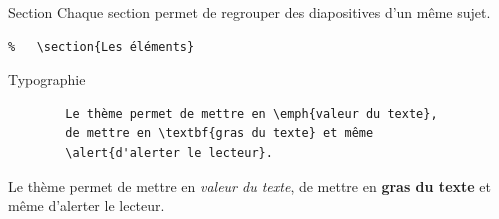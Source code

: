 \documentclass[9pt]{beamer}
\begin{document}
\begin{frame}[fragile]{Section}
	Chaque section permet de regrouper des diapositives d'un même sujet.
	\begin{verbatim}
% 	\section{Les éléments}
	\end{verbatim}
 \end{frame}

 \begin{frame}[fragile]{Typographie}
 	\begin{verbatim}
		Le thème permet de mettre en \emph{valeur du texte},
		de mettre en \textbf{gras du texte} et même
		\alert{d'alerter le lecteur}.
 	\end{verbatim}
 	Le thème permet de mettre en \emph{valeur du texte}, de mettre en \textbf{gras du texte} et même \alert{d'alerter le lecteur}.
 \end{frame}
%
\end{document}
